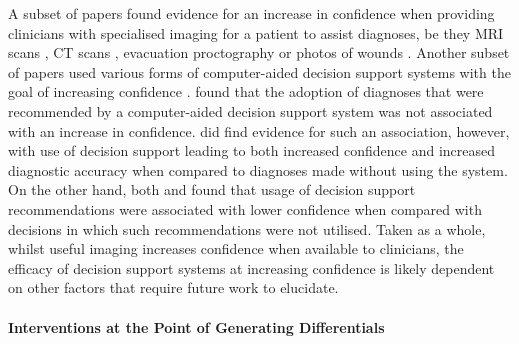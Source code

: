 \documentclass[a4paper, nobind]{templates/ociamthesis}
\begin{document}
A subset of papers found evidence for an increase in confidence when providing clinicians with specialised imaging for a patient to assist diagnoses, be they MRI scans \autocite{mackenzie_magnetic_1996,albrechtsen_impact_2022}, CT scans \autocite{abujudeh_abdominopelvic_2011}, evacuation proctography \autocite{harvey_evacuation_1999} or photos of wounds \autocite{sanger_diagnosing_2017}. Another subset of papers used various forms of computer-aided decision support systems with the goal of increasing confidence \autocite{hillson_effects_1995,berner_influence_1999,dreiseitl_physicians_2005,neugebauer_clinical_2020}. \textcite{hillson_effects_1995} found that the adoption of diagnoses that were recommended by a computer-aided decision support system was not associated with an increase in confidence. \textcite{neugebauer_clinical_2020} did find evidence for such an association, however, with use of decision support leading to both increased confidence and increased diagnostic accuracy when compared to diagnoses made without using the system. On the other hand, both \textcite{berner_influence_1999} and \textcite{dreiseitl_physicians_2005} found that usage of decision support recommendations were associated with lower confidence when compared with decisions in which such recommendations were not utilised. Taken as a whole, whilst useful imaging increases confidence when available to clinicians, the efficacy of decision support systems at increasing confidence is likely dependent on other factors that require future work to elucidate.

\paragraph{Interventions at the Point of Generating Differentials}\label{interventions-at-the-point-of-generating-differentials}
\end{document}
